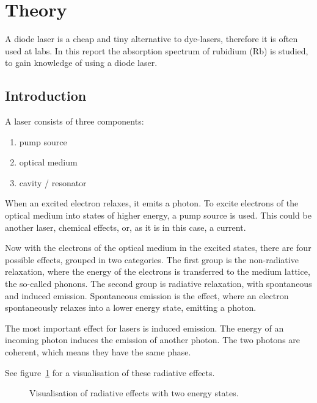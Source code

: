 \section{Theory}\label{theory}

A diode laser is a cheap and tiny alternative to dye-lasers, therefore it is often used at labs.
In this report the absorption spectrum of rubidium (Rb) is studied, to gain knowledge of using
a diode laser.

\subsection{Introduction}\label{introduction}

A laser consists of three components:

\begin{enumerate}
  \item pump source
  \item optical medium
  \item cavity / resonator
\end{enumerate}

When an excited electron relaxes, it emits a photon.
To excite electrons of the optical medium into states of higher energy, a pump source is used.
This could be another laser, chemical effects, or, as it is in this case, a current.

Now with the electrons of the optical medium in the excited states, there are four possible
effects, grouped in two categories.
The first group is the non-radiative relaxation, where the energy of the electrons is transferred
to the medium lattice, the so-called phonons.
The second group is radiative relaxation, with spontaneous and induced emission.
Spontaneous emission is the effect, where an electron spontaneously relaxes into a lower energy
state, emitting a photon.

The most important effect for lasers is induced emission.
The energy of an incoming photon induces the emission of another photon.
The two photons are coherent, which means they have the same phase.

See figure~\ref{fig:two_niveau_laser} for a visualisation of these radiative effects.
\begin{figure}[ht]
  \centering
  
  \caption{Visualisation of radiative effects with two energy states\cite{anleitung_hene}.}%
  \label{fig:two_niveau_laser}
\end{figure}

